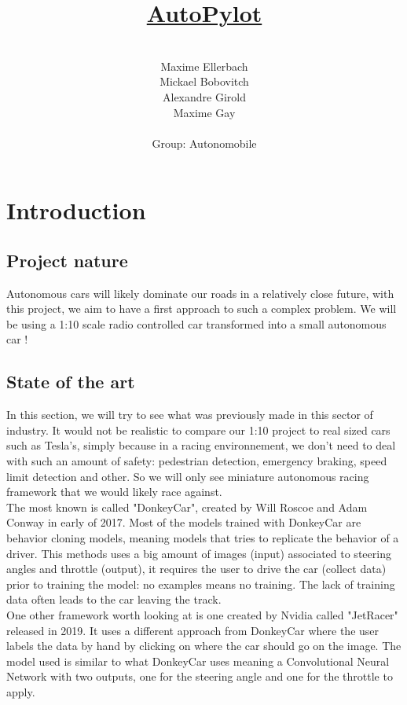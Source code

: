 \documentclass[12pt]{article}
\title{\underline{AutoPylot}}
\date{}
\author{%
    \\
    Maxime Ellerbach \\
    Mickael Bobovitch \\
    Alexandre Girold \\
    Maxime Gay \\ \\
    Group: Autonomobile 
    }
\begin{document}
\maketitle
\newpage

\tableofcontents
\newpage

\section{Introduction}

\subsection{Project nature}
Autonomous cars will likely dominate our roads in a relatively close future,
with this project, we aim to have a first approach to such a complex problem.
We will be using a 1:10 scale radio controlled car transformed into a small autonomous car !

\subsection{State of the art}

In this section, we will try to see what was previously made in this sector of industry.
It would not be realistic to compare our 1:10 project to real sized cars such as Tesla's, simply because in a racing environnement,
we don't need to deal with such an amount of safety: pedestrian detection, emergency braking, speed limit detection and other.
So we will only see miniature autonomous racing framework that we would likely race against.\\

The most known is called "DonkeyCar", created by Will Roscoe and Adam Conway in early of 2017. Most of the models trained with DonkeyCar are behavior cloning models, meaning models that tries to replicate the behavior of a driver. This methods uses a big amount of images (input) associated to steering angles and throttle (output), it requires the user to drive the car (collect data) prior to training the model: no examples means no training. The lack of training data often leads to the car leaving the track.\\

One other framework worth looking at is one created by Nvidia called "JetRacer" released in 2019. It uses a different approach from DonkeyCar where the user labels the data by hand by clicking on where the car should go on the image. The model used is similar to what DonkeyCar uses meaning a Convolutional Neural Network with two outputs, one for the steering angle and one for the throttle to apply.
\end{document}
